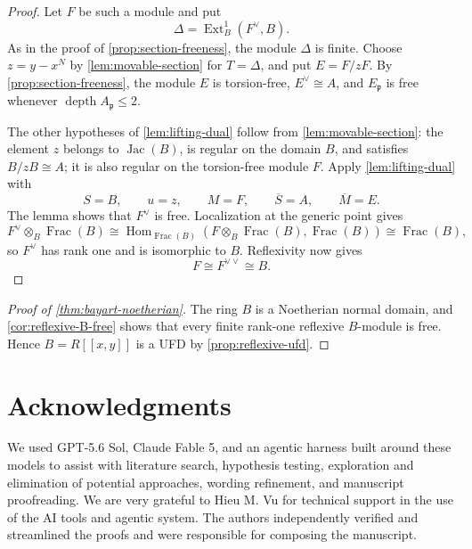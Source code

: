 \documentclass[reqno]{amsart}
\theoremstyle{plain}
\theoremstyle{definition}
\newcommand{\Jac}{\operatorname{Jac}}
\newcommand{\depth}{\operatorname{depth}}
\newcommand{\Ext}{\operatorname{Ext}}
\newcommand{\Hom}{\operatorname{Hom}}
\newcommand{\Frac}{\operatorname{Frac}}
\begin{document}
\begin{proof}
Let $F$ be such a module and put
\[
  \Delta=\Ext^1_B(F^\vee,B).
\]
As in the proof of \cref{prop:section-freeness}, the module $\Delta$ is
finite.  Choose $z=y-x^N$ by \cref{lem:movable-section} for
$T=\Delta$, and put $E=F/zF$.  By
\cref{prop:section-freeness}, the module $E$ is torsion-free,
$E^\vee\cong A$, and $E_{\mathfrak p}$ is free whenever
$\depth A_{\mathfrak p}\leq2$.

The other hypotheses of \cref{lem:lifting-dual} follow from
\cref{lem:movable-section}: the element $z$ belongs to $\Jac(B)$, is
regular on the domain $B$, and satisfies $B/zB\cong A$; it is also regular
on the torsion-free module $F$.  Apply \cref{lem:lifting-dual} with
\[
 S=B,\qquad u=z,\qquad M=F,
 \qquad\overline S=A,\qquad\overline M=E.
\]
The lemma shows that $F^\vee$ is free.  Localization at the generic point gives
\[
 F^\vee\otimes_B\Frac(B)
 \cong\Hom_{\Frac(B)}
       (F\otimes_B\Frac(B),\Frac(B))
 \cong\Frac(B),
\]
so $F^\vee$ has rank one and is isomorphic to $B$.  Reflexivity now gives
\[
  F\cong F^{\vee\vee}\cong B.
\]
\end{proof}

\begin{proof}[Proof of \cref{thm:bayart-noetherian}]
The ring $B$ is a Noetherian normal domain, and
\cref{cor:reflexive-B-free} shows that every finite rank-one reflexive
$B$-module is free.  Hence $B=R[[x,y]]$ is a UFD by
\cref{prop:reflexive-ufd}.
\end{proof}


\section*{Acknowledgments}

We used GPT-5.6 Sol, Claude Fable 5, and an agentic harness built around these
models to assist with literature search, hypothesis testing, exploration and
elimination of potential approaches, wording refinement, and manuscript
proofreading.  We are very grateful to Hieu M. Vu for technical support in the
use of the AI tools and agentic system.  The authors independently verified and
streamlined the proofs and were responsible for composing the manuscript.

\raggedbottom
\begingroup
\raggedright


\endgroup
\end{document}
